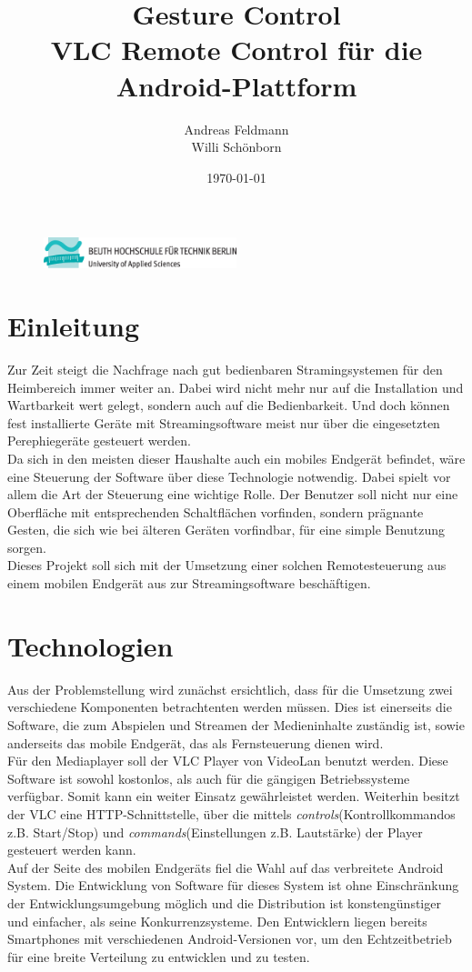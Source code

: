 \documentclass[a4paper]{article}
\title{Gesture Control \\ VLC Remote Control für die Android-Plattform}
\author{Andreas Feldmann \\ Willi Schönborn}
\date{\today}
\begin{document}
\begin{figure}[H]
\centering
\includegraphics[width=0.5\textwidth]{beuth.eps}
\maketitle
\end{figure}

\section*{Einleitung}
Zur Zeit steigt die Nachfrage nach gut bedienbaren Stramingsystemen für den Heimbereich immer weiter an. Dabei wird nicht mehr nur auf die Installation und Wartbarkeit wert gelegt, sondern auch auf die Bedienbarkeit. Und doch können fest installierte Geräte mit Streamingsoftware meist nur über die eingesetzten Perephiegeräte gesteuert werden. \\
Da sich in den meisten dieser Haushalte auch ein mobiles Endgerät befindet, wäre eine Steuerung der Software über diese Technologie  notwendig. Dabei spielt vor allem die Art der Steuerung eine wichtige Rolle. Der Benutzer soll nicht nur eine Oberfläche mit entsprechenden Schaltflächen vorfinden, sondern prägnante Gesten, die sich wie bei älteren Geräten vorfindbar, für eine simple Benutzung sorgen.\\
Dieses Projekt soll sich mit der Umsetzung einer solchen Remotesteuerung aus einem mobilen Endgerät aus zur Streamingsoftware beschäftigen.

\section*{Technologien}
Aus der Problemstellung wird zunächst ersichtlich, dass für die Umsetzung zwei verschiedene Komponenten betrachtenten werden müssen. Dies ist einerseits die Software, die zum Abspielen und Streamen der Medieninhalte zuständig ist, sowie anderseits das mobile Endgerät, das als Fernsteuerung dienen wird. \\
Für den Mediaplayer soll der VLC Player von VideoLan benutzt werden. Diese Software ist sowohl kostonlos, als auch für die gängigen Betriebssysteme verfügbar. Somit kann ein weiter Einsatz gewährleistet werden. Weiterhin besitzt der VLC eine HTTP-Schnittstelle, über die mittels \textit{controls}(Kontrollkommandos z.B. Start/Stop) und \textit{commands}(Einstellungen z.B. Lautstärke) der Player gesteuert werden kann. \\
Auf der Seite des mobilen Endgeräts fiel die Wahl auf das verbreitete Android System. Die Entwicklung von Software für dieses System ist ohne Einschränkung der Entwicklungsumgebung möglich und die Distribution ist konstengünstiger und einfacher, als seine Konkurrenzsysteme. Den Entwicklern liegen bereits Smartphones mit verschiedenen Android-Versionen vor, um den Echtzeitbetrieb für eine breite Verteilung zu entwicklen und zu testen.
\newpage
\end{document}
